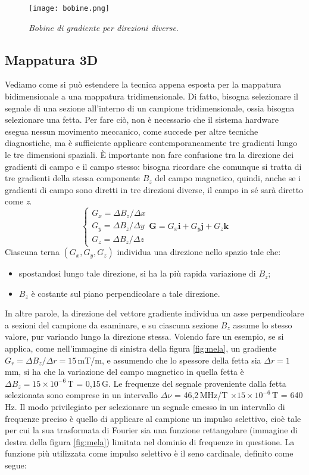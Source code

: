 \documentclass{report}
\newcommand{\figref}[1]{figura \ref{#1}}
\numberwithin{equation}{section}
\numberwithin{figure}{section}
\renewcommand{\Vec}{\bm}
\begin{document}
\begin{figure}[htp]
\centering
\texttt{[image: bobine.png]}
\caption{\label{fig:bobine} \textit{Bobine di gradiente per direzioni diverse}.}
\end{figure}

\subsection{Mappatura 3D}
Vediamo come si può estendere la tecnica appena esposta per la mappatura bidimensionale a una mappatura tridimensionale. Di fatto, bisogna selezionare il segnale di una sezione all'interno di un campione tridimensionale, ossia bisogna selezionare una fetta. Per fare ciò, non è necessario che il sistema hardware esegua nessun movimento meccanico, come succede per altre tecniche diagnostiche, ma è sufficiente applicare contemporaneamente tre gradienti lungo le tre dimensioni spaziali. È importante non fare confusione tra la direzione dei gradienti di campo e il campo stesso: bisogna ricordare che comunque si tratta di tre gradienti della stessa componente $B_z$ del campo magnetico, quindi, anche se i gradienti di campo sono diretti in tre direzioni diverse, il campo in sé sarà diretto come \textit{z}.
\begin{equation}\boxed{
    \begin{cases}
    G_x = \Delta B_z/\Delta x \\
    G_y = \Delta B_z/\Delta y \\
    G_z = \Delta B_z/\Delta z
    \end{cases}
    \Vec{G}=G_x\Vec{i}+G_y\Vec{j}+G_z\Vec{k}}
\end{equation}
Ciascuna terna $(G_x,G_y,G_z)$ individua una direzione nello spazio tale che:
\begin{itemize}[label=$-$]
    \item spostandosi lungo tale direzione, si ha la più rapida variazione di $B_z$;
    \item $B_z$ è costante sul piano perpendicolare a tale direzione.
\end{itemize}
In altre parole, la direzione del vettore gradiente individua un asse perpendicolare a sezioni del campione da esaminare, e su ciascuna sezione $B_z$ assume lo stesso valore, pur variando lungo la direzione stessa. Volendo fare un esempio, se si applica, come nell'immagine di sinistra della \figref{fig:mela}, un gradiente $G_r=\Delta B_z/\Delta r=15$\,mT/m, e assumendo che lo spessore della fetta sia $\Delta r=1$\,mm, si ha che la variazione del campo magnetico in quella fetta è $\Delta B_z=15\times10^{-6}$\,T = 0,15\,G. Le frequenze del segnale proveniente dalla fetta selezionata sono comprese in un intervallo $\Delta \nu$ = 46,2\,MHz/T $\times 15 \times 10^{-6}$\,T = 640\,Hz. Il modo privilegiato per selezionare un segnale emesso in un intervallo di frequenze preciso è quello di applicare al campione un impulso selettivo, cioè tale per cui la sua trasformata di Fourier sia una funzione rettangolare (immagine di destra della \figref{fig:mela}) limitata nel dominio di frequenze in questione. La funzione più utilizzata come impulso selettivo è il seno cardinale, definito come segue:
\end{document}
